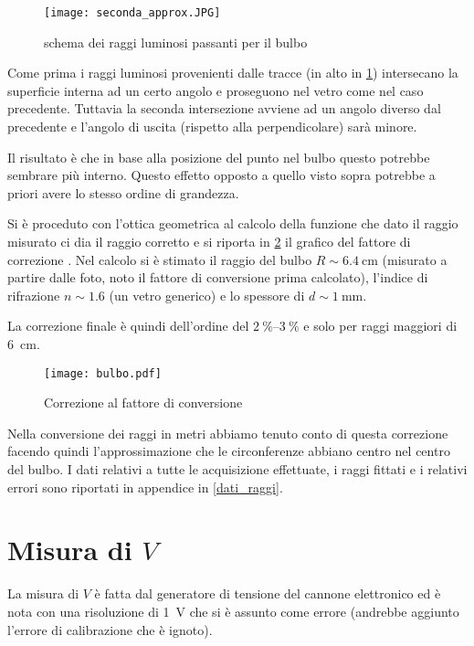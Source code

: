 \begin{figure}[H]
	\centering
	\texttt{[image: seconda\_approx.JPG]}
	\caption{schema dei raggi luminosi passanti per il bulbo}
	\label{ottica2}
\end{figure}

Come prima i raggi luminosi provenienti dalle tracce (in alto in \figurename{ \ref{ottica2}}) intersecano la superficie interna ad un certo angolo e proseguono nel vetro come nel caso precedente. Tuttavia la seconda intersezione avviene ad un angolo diverso dal precedente e l'angolo di uscita (rispetto alla perpendicolare) sarà minore.

Il risultato è che in base alla posizione del punto nel bulbo questo potrebbe sembrare più interno. Questo effetto opposto a quello visto sopra potrebbe a priori avere lo stesso ordine di grandezza.

Si è proceduto con l'ottica geometrica al calcolo della funzione che dato il raggio misurato ci dia il raggio corretto e si riporta in \figurename{ \ref{bulbo}} il grafico del fattore di correzione . Nel calcolo si è stimato il raggio del bulbo $R \sim \SI{6.4}{\cm}$ (misurato a partire dalle foto, noto il fattore di conversione prima calcolato), l'indice di rifrazione $n \sim 1.6$ (un vetro generico) e lo spessore di $d \sim \SI{1}{\mm}$.

La correzione finale è quindi dell'ordine del $\SIrange{2}{3}{\percent}$ e solo per raggi maggiori di \SI{6}{\cm}.

\begin{figure}[H]
	\centering
	\texttt{[image: bulbo.pdf]}
	\caption{Correzione al fattore di conversione}
	\label{bulbo}
\end{figure}

Nella conversione dei raggi in metri abbiamo tenuto conto di questa correzione facendo quindi l'approssimazione che le circonferenze abbiano centro nel centro del bulbo.
I dati relativi a tutte le acquisizione effettuate, i raggi fittati e i relativi errori sono riportati in appendice in \tablename{ \ref{dati_raggi}}.

\section{Misura di $V$}
La misura di $V$ è fatta dal generatore di tensione del cannone elettronico ed è nota con una risoluzione di \SI{1}{\volt} che si è assunto come errore (andrebbe aggiunto l'errore di calibrazione che è ignoto).

